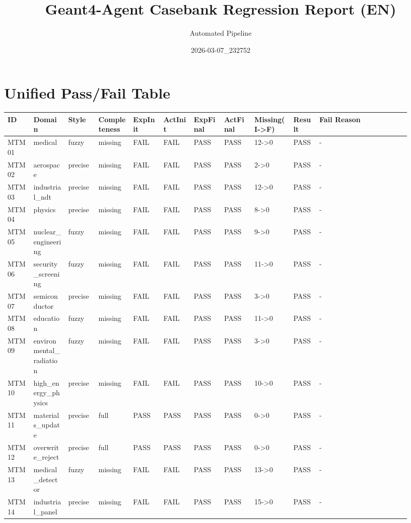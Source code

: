 \documentclass[11pt]{ctexart}
\title{Geant4-Agent Casebank Regression Report (EN)}
\author{Automated Pipeline}
\date{2026-03-07\_232752}
\begin{document}
\maketitle
\section{Unified Pass/Fail Table}
\begin{longtable}{p{0.06\linewidth}p{0.08\linewidth}p{0.07\linewidth}p{0.08\linewidth}p{0.07\linewidth}p{0.07\linewidth}p{0.07\linewidth}p{0.07\linewidth}p{0.09\linewidth}p{0.06\linewidth}p{0.21\linewidth}}
\toprule
ID & Domain & Style & Completeness & ExpInit & ActInit & ExpFinal & ActFinal & Missing(I->F) & Result & Fail Reason \\
\midrule
MTM01 & medical & fuzzy & missing & FAIL & FAIL & PASS & PASS & 12->0 & PASS & - \\
MTM02 & aerospace & precise & missing & FAIL & FAIL & PASS & PASS & 2->0 & PASS & - \\
MTM03 & industrial\_ndt & precise & missing & FAIL & FAIL & PASS & PASS & 12->0 & PASS & - \\
MTM04 & physics & precise & missing & FAIL & FAIL & PASS & PASS & 8->0 & PASS & - \\
MTM05 & nuclear\_engineering & fuzzy & missing & FAIL & FAIL & PASS & PASS & 9->0 & PASS & - \\
MTM06 & security\_screening & fuzzy & missing & FAIL & FAIL & PASS & PASS & 11->0 & PASS & - \\
MTM07 & semiconductor & precise & missing & FAIL & FAIL & PASS & PASS & 3->0 & PASS & - \\
MTM08 & education & fuzzy & missing & FAIL & FAIL & PASS & PASS & 11->0 & PASS & - \\
MTM09 & environmental\_radiation & fuzzy & missing & FAIL & FAIL & PASS & PASS & 3->0 & PASS & - \\
MTM10 & high\_energy\_physics & precise & missing & FAIL & FAIL & PASS & PASS & 10->0 & PASS & - \\
MTM11 & materials\_update & precise & full & PASS & PASS & PASS & PASS & 0->0 & PASS & - \\
MTM12 & overwrite\_reject & precise & full & PASS & PASS & PASS & PASS & 0->0 & PASS & - \\
MTM13 & medical\_detector & fuzzy & missing & FAIL & FAIL & PASS & PASS & 13->0 & PASS & - \\
MTM14 & industrial\_panel & precise & missing & FAIL & FAIL & PASS & PASS & 15->0 & PASS & - \\

\end{longtable}
\end{document}
